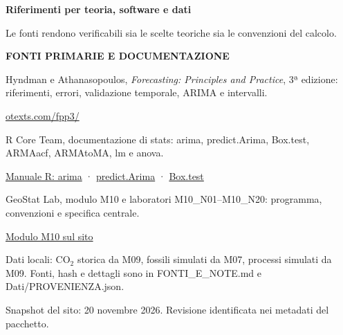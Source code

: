 \documentclass[12pt,aspectratio=1610]{beamer}
\newcommand{\PLabel}[1]{\par{\color{Classical}\bfseries\fontsize{9}{11}\selectfont\MakeUppercase{#1}}\par\vspace{1.8mm}}
\newcommand{\PBody}[1]{\par{\fontsize{11.3}{14.8}\selectfont #1\par}}
\newcommand{\PSmall}[1]{\par{\fontsize{9.8}{13.1}\selectfont #1\par}}
\newcommand{\PInfo}[1]{%
\begin{tcolorbox}[enhanced,arc=1.6mm,boxrule=.55pt,colback=GeoTint,
 colframe=Rule!80!Classical,left=2.3mm,right=2.3mm,top=2mm,bottom=2mm,
 before skip=1mm,after skip=1mm]
\PSmall{#1}\end{tcolorbox}}
\begin{document}
\begin{frame}[plain]\hypertarget{slide109}{}
\begin{lrbox}{\TitleBox}
\begin{minipage}[t]{17.7cm}\raggedright\color{Ink}\fontsize{11.3}{14.8}\selectfont
\color{Navy}\bfseries\fontsize{20.6}{24.5}\selectfont Riferimenti per teoria, software e dati
\end{minipage}\end{lrbox}

\begin{lrbox}{\RecallBox}
\begin{minipage}[t]{14.3cm}\raggedright\color{Ink}\fontsize{11.3}{14.8}\selectfont
\fontsize{10.3}{13.8}\selectfont Le fonti rendono verificabili sia le scelte teoriche sia le convenzioni del calcolo.
\end{minipage}\end{lrbox}

\begin{lrbox}{\PilotLeftBox}
\begin{minipage}[t]{10.05cm}\raggedright\color{Ink}\fontsize{11.3}{14.8}\selectfont
\PLabel{Fonti primarie e documentazione}
\PBody{Hyndman e Athanasopoulos, \emph{Forecasting: Principles and Practice}, 3ª edizione: riferimenti, errori, validazione temporale, ARIMA e intervalli.}
\vspace{2.5mm}
\PSmall{\href{https://otexts.com/fpp3/}{otexts.com/fpp3/}}
\PBody{R Core Team, documentazione di stats: arima, predict.Arima, Box.test, ARMAacf, ARMAtoMA, lm e anova.}
\vspace{2.5mm}
\PSmall{\href{https://stat.ethz.ch/R-manual/R-devel/library/stats/html/arima.html}{Manuale R: arima} · \href{https://stat.ethz.ch/R-manual/R-devel/library/stats/html/predict.arima.html}{predict.Arima} · \href{https://stat.ethz.ch/R-manual/R-devel/library/stats/html/box.test.html}{Box.test}}

\end{minipage}\end{lrbox}

\begin{lrbox}{\PilotRightBox}
\begin{minipage}[t]{7.55cm}\raggedright\color{Ink}\fontsize{11.3}{14.8}\selectfont
\PBody{GeoStat Lab, modulo M10 e laboratori M10\_N01--M10\_N20: programma, convenzioni e specifica centrale.}
\vspace{2.5mm}
\PSmall{\href{https://marzione00.github.io/Lab_Geo/percorso/M10.html}{Modulo M10 sul sito}}
\PInfo{Dati locali: CO$_2$ storica da M09, fossili simulati da M07, processi simulati da M09. Fonti, hash e dettagli sono in FONTI\_E\_NOTE.md e Dati/PROVENIENZA.json.}
\PSmall{Snapshot del sito: 20 novembre 2026. Revisione identificata nei metadati del pacchetto.}


\end{minipage}
\end{lrbox}
\end{frame}
\end{document}
